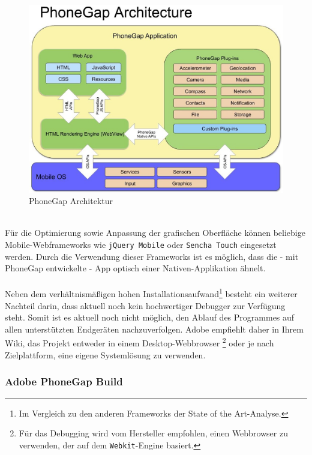 \documentclass[../Bachelorarbeit.tex]{subfiles}
\begin{document}
\begin{figure}
\centering
\includegraphics[width=0.8\linewidth]{./img/phonegap-architecture-by-ibm-29-july-2011-modules-instead-plug-ins}
\caption[PhoneGap Architektur]{PhoneGap Architektur \parencite[Quelle:][]{phonegap_Architektur}}
\label{fig:phonegap-architecture}
\end{figure}
\mbox{} \\
Für die Optimierung sowie Anpassung der grafischen Oberfläche können beliebige Mobile-Webframeworks wie \texttt{jQuery Mobile} oder \texttt{Sencha Touch} eingesetzt werden. 
Durch die Verwendung dieser Frameworks ist es möglich, dass die - mit PhoneGap entwickelte - App optisch einer Nativen-Applikation ähnelt.\\
\\
Neben dem verhältnismäßigen hohen Installationsaufwand\footnote{Im Vergleich zu den anderen Frameworks der State of the Art-Analyse.} besteht ein weiterer Nachteil darin, dass aktuell noch kein hochwertiger Debugger zur Verfügung steht.
Somit ist es aktuell noch nicht möglich, den Ablauf des Programmes auf allen unterstützten Endgeräten nachzuverfolgen. 
Adobe empfiehlt daher in Ihrem Wiki, das Projekt entweder in einem Desktop-Webbrowser
\footnote{Für das Debugging wird vom Hersteller empfohlen, einen Webbrowser zu verwenden, der auf dem \texttt{Webkit}-Engine basiert.} oder je nach Zielplattform, eine eigene Systemlösung zu verwenden\parencite[vgl.][]{phonegapWiki_debuging}.


 

\subsubsection*{Adobe PhoneGap Build}
\label{subsub:phonegap_build}
\end{document}
